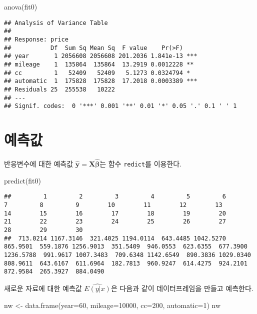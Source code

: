 \documentclass[
]{book}
\newenvironment{Shaded}{\begin{snugshade}}{\end{snugshade}}
\newcommand{\AttributeTok}[1]{\textcolor[rgb]{0.77,0.63,0.00}{#1}}
\newcommand{\DecValTok}[1]{\textcolor[rgb]{0.00,0.00,0.81}{#1}}
\newcommand{\FunctionTok}[1]{\textcolor[rgb]{0.00,0.00,0.00}{#1}}
\newcommand{\NormalTok}[1]{#1}
\newcommand{\OtherTok}[1]{\textcolor[rgb]{0.56,0.35,0.01}{#1}}
\begin{document}
\begin{Shaded}
\begin{Highlighting}[]
\FunctionTok{anova}\NormalTok{(fit0)}
\end{Highlighting}
\end{Shaded}

\begin{verbatim}
## Analysis of Variance Table
## 
## Response: price
##           Df  Sum Sq Mean Sq  F value    Pr(>F)    
## year       1 2056608 2056608 201.2036 1.841e-13 ***
## mileage    1  135864  135864  13.2919 0.0012228 ** 
## cc         1   52409   52409   5.1273 0.0324794 *  
## automatic  1  175828  175828  17.2018 0.0003389 ***
## Residuals 25  255538   10222                       
## ---
## Signif. codes:  0 '***' 0.001 '**' 0.01 '*' 0.05 '.' 0.1 ' ' 1
\end{verbatim}

\hypertarget{uxc608uxce21uxac12}{%
\section{예측값}\label{uxc608uxce21uxac12}}

반응변수에 대한 예측값 \(\hat {\bm y} = \bm X \hat {\bm \beta}\)는 함수 \texttt{redict}를 이용한다.

\begin{Shaded}
\begin{Highlighting}[]
\FunctionTok{predict}\NormalTok{(fit0)}
\end{Highlighting}
\end{Shaded}

\begin{verbatim}
##         1         2         3         4         5         6         7         8         9        10        11        12        13        14        15        16        17        18        19        20        21        22        23        24        25        26        27        28        29        30 
##  713.0214 1167.3146  321.4025 1194.0114  643.4485 1042.5270  865.9501  559.1876 1256.9013  351.5409  946.0553  623.6355  677.3900 1236.5788  991.9617 1007.3483  709.6348 1142.6549  890.3836 1029.0340  808.9611  643.6167  611.6964  182.7813  960.9247  614.4275  924.2101  872.9584  265.3927  884.0490
\end{verbatim}

새로운 자료에 대한 예측값 \(\widehat { E(y|x)}\)은 다음과 같이 데이터프레임을 만들고 예측한다.

\begin{Shaded}
\begin{Highlighting}[]
\NormalTok{nw }\OtherTok{\textless{}{-}} \FunctionTok{data.frame}\NormalTok{(}\AttributeTok{year=}\DecValTok{60}\NormalTok{, }\AttributeTok{mileage=}\DecValTok{10000}\NormalTok{, }\AttributeTok{cc=}\DecValTok{200}\NormalTok{, }\AttributeTok{automatic=}\DecValTok{1}\NormalTok{)}
\NormalTok{nw}
\end{Highlighting}
\end{Shaded}
\end{document}
